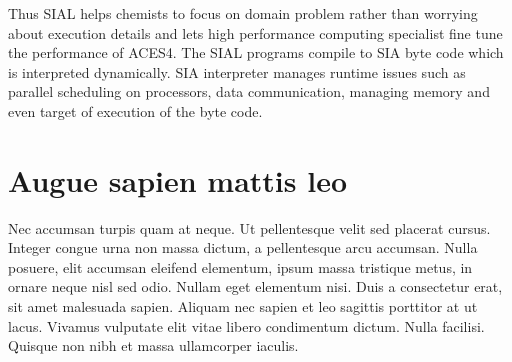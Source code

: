 Thus SIAL helps chemists to focus on domain problem rather than worrying about
execution details and lets high performance computing specialist fine tune the
performance of ACES4. The SIAL programs compile to SIA byte code which is
interpreted dynamically. SIA interpreter manages runtime issues such as parallel
scheduling on processors, data communication, managing memory and even target of
execution of the byte code.

\section{Augue sapien mattis leo}
Nec accumsan turpis quam at neque. Ut pellentesque velit sed placerat cursus. Integer congue urna non massa dictum, a pellentesque arcu accumsan. Nulla posuere, elit accumsan eleifend elementum, ipsum massa tristique metus, in ornare neque nisl sed odio. Nullam eget elementum nisi. Duis a consectetur erat, sit amet malesuada sapien. Aliquam nec sapien et leo sagittis porttitor at ut lacus. Vivamus vulputate elit vitae libero condimentum dictum. Nulla facilisi. Quisque non nibh et massa ullamcorper iaculis.


